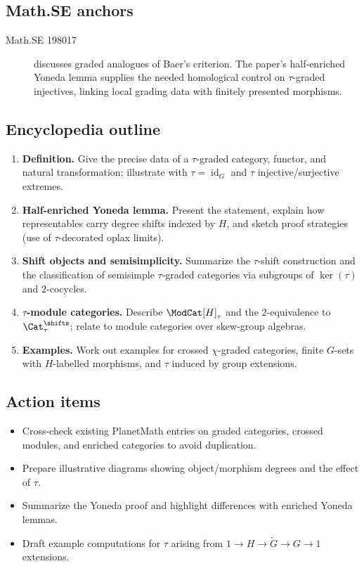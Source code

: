 \subsection*{Math.SE anchors}
\begin{description}
  \item[Math.SE 198017] discusses graded analogues of Baer's criterion. The paper’s half-enriched Yoneda lemma supplies the needed homological control on $\tau$-graded injectives, linking local grading data with finitely presented morphisms.
\end{description}
\subsection*{Encyclopedia outline}
\begin{enumerate}
  \item \textbf{Definition.} Give the precise data of a $\tau$-graded category, functor, and natural transformation; illustrate with $\tau=\operatorname{id}_G$ and $\tau$ injective/surjective extremes.
  \item \textbf{Half-enriched Yoneda lemma.} Present the statement, explain how representables carry degree shifts indexed by $H$, and sketch proof strategies (use of $\tau$-decorated oplax limits).
  \item \textbf{Shift objects and semisimplicity.} Summarize the $\tau$-shift construction and the classification of semisimple $\tau$-graded categories via subgroups of $\ker(\tau)$ and $2$-cocycles.
  \item \textbf{$\tau$-module categories.} Describe $\ModCat[H]_{\tau}$ and the $2$-equivalence to $\Cat_{\tau}^{\shifts}$; relate to module categories over skew-group algebras.
  \item \textbf{Examples.} Work out examples for crossed $\chi$-graded categories, finite $G$-sets with $H$-labelled morphisms, and $\tau$ induced by group extensions.
\end{enumerate}
\subsection*{Action items}
\begin{itemize}
  \item Cross-check existing PlanetMath entries on graded categories, crossed modules, and enriched categories to avoid duplication.
  \item Prepare illustrative diagrams showing object/morphism degrees and the effect of $\tau$.
  \item Summarize the Yoneda proof and highlight differences with enriched Yoneda lemmas.
  \item Draft example computations for $\tau$ arising from $1 \to H \to \widetilde{G} \to G \to 1$ extensions.
\end{itemize}
